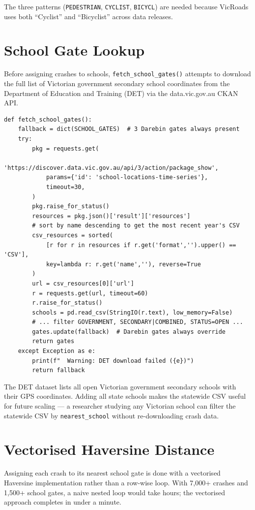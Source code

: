 \documentclass[11pt,a4paper,openany]{book}
\begin{document}
The three patterns (\texttt{PEDESTRIAN}, \texttt{CYCLIST}, \texttt{BICYCL}) are
needed because VicRoads uses both ``Cyclist'' and ``Bicyclist'' across data releases.

\section{School Gate Lookup}

Before assigning crashes to schools, \texttt{fetch\_school\_gates()} attempts to
download the full list of Victorian government secondary school coordinates from the
Department of Education and Training (DET) via the data.vic.gov.au CKAN API.

\begin{lstlisting}[style=python, caption={DET school download with fallback.}]
def fetch_school_gates():
    fallback = dict(SCHOOL_GATES)  # 3 Darebin gates always present
    try:
        pkg = requests.get(
            'https://discover.data.vic.gov.au/api/3/action/package_show',
            params={'id': 'school-locations-time-series'},
            timeout=30,
        )
        pkg.raise_for_status()
        resources = pkg.json()['result']['resources']
        # sort by name descending to get the most recent year's CSV
        csv_resources = sorted(
            [r for r in resources if r.get('format','').upper() == 'CSV'],
            key=lambda r: r.get('name',''), reverse=True
        )
        url = csv_resources[0]['url']
        r = requests.get(url, timeout=60)
        r.raise_for_status()
        schools = pd.read_csv(StringIO(r.text), low_memory=False)
        # ... filter GOVERNMENT, SECONDARY|COMBINED, STATUS=OPEN ...
        gates.update(fallback)  # Darebin gates always override
        return gates
    except Exception as e:
        print(f"  Warning: DET download failed ({e})")
        return fallback
\end{lstlisting}

The DET dataset lists all open Victorian government secondary schools with their
GPS coordinates.  Adding all state schools makes the statewide CSV useful for
future scaling --- a researcher studying any Victorian school can filter the
statewide CSV by \texttt{nearest\_school} without re-downloading crash data.

\section{Vectorised Haversine Distance}

Assigning each crash to its nearest school gate is done with a vectorised
Haversine implementation rather than a row-wise loop.  With 7,000+ crashes
and 1,500+ school gates, a naive nested loop would take hours; the vectorised
approach completes in under a minute.
\end{document}
